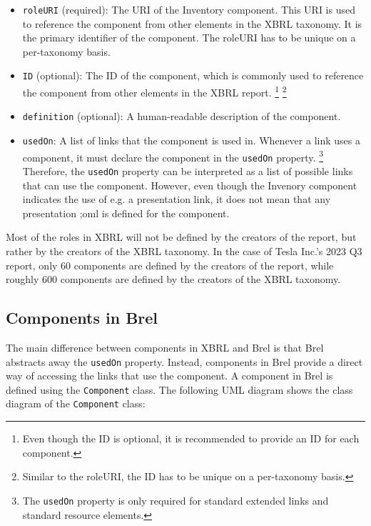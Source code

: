 \begin{itemize}
  \item \texttt{roleURI} (required): The URI of the Inventory component. This URI is used to reference the component from other elements in the XBRL taxonomy. It is the primary identifier of the component. 
  The roleURI has to be unique on a per-taxonomy basis.\cite{xbrl21_custom_roles}
  \item \texttt{ID} (optional): The ID of the component, which is commonly used to reference the component from other elements in the XBRL report.
  \footnote{Even though the ID is optional, it is recommended to provide an ID for each component.\cite{xbrl21_custom_roles}}
  \footnote{Similar to the roleURI, the ID has to be unique on a per-taxonomy basis.\cite{xml_id}}
  \item \texttt{definition} (optional): A human-readable description of the component. 
  \item \texttt{usedOn}: A list of links that the component is used in. 
  Whenever a link uses a component, it must declare the component in the \texttt{usedOn} property.
  \footnote{The \texttt{usedOn} property is only required for standard extended links and standard resource elements.\cite{xbrl21_custom_roles}}
  Therefore, the \texttt{usedOn} property can be interpreted as a list of possible links that can use the component.
  However, even though the Invenory component indicates the use of e.g. a presentation link, it does not mean that any presentation ;oml is defined for the component.
\end{itemize}

Most of the roles in XBRL will not be defined by the creators of the report, but rather by the creators of the XBRL taxonomy. 
In the case of Tesla Inc.'s 2023 Q3 report, only 60 components are defined by the creators of the report, while roughly 600 components are defined by the creators of the XBRL taxonomy.\cite{tesla_10q_2023_q3}

\subsection{Components in Brel}

The main difference between components in XBRL and Brel is that Brel abstracts away the \texttt{usedOn} property. 
Instead, components in Brel provide a direct way of accessing the links that use the component. 
A component in Brel is defined using the \texttt{Component} class. 
The following UML diagram shows the class diagram of the \texttt{Component} class:

